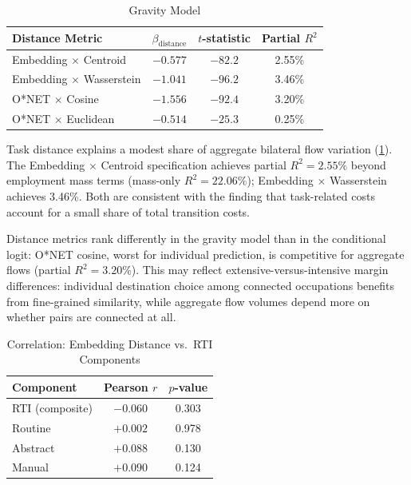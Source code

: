 \documentclass[12pt]{article}
\begin{document}
\begin{table}[h!]
\centering
\caption{Gravity Model}
\label{tab:gravity-comparison}
\begin{tabular}{lccc}
\toprule
\textbf{Distance Metric} & $\beta_{\mathrm{distance}}$ & $t$-statistic & Partial $R^2$ \\
\midrule
Embedding $\times$ Centroid & $-0.577$ & $-82.2$ & 2.55\% \\
Embedding $\times$ Wasserstein & $-1.041$ & $-96.2$ & 3.46\% \\
O*NET $\times$ Cosine & $-1.556$ & $-92.4$ & 3.20\% \\
O*NET $\times$ Euclidean & $-0.514$ & $-25.3$ & 0.25\% \\
\bottomrule
\end{tabular}
\end{table}


Task distance explains a modest share of aggregate bilateral flow variation (\cref{tab:gravity-comparison}). The Embedding $\times$ Centroid specification achieves partial $R^2 = 2.55\%$ beyond employment mass terms (mass-only $R^2 = 22.06\%$); Embedding $\times$ Wasserstein achieves 3.46\%. Both are consistent with the \citet{CortesGallipoli2018} finding that task-related costs account for a small share of total transition costs.

Distance metrics rank differently in the gravity model than in the conditional logit: O*NET cosine, worst for individual prediction, is competitive for aggregate flows (partial $R^2 = 3.20\%$). This may reflect extensive-versus-intensive margin differences: individual destination choice among connected occupations benefits from fine-grained similarity, while aggregate flow volumes depend more on whether pairs are connected at all.


\begin{table}[h!]
\centering
\caption{Correlation: Embedding Distance vs.\ RTI Components}
\label{tab:rti-correlation}
\begin{tabular}{lcc}
\toprule
\textbf{Component} & \textbf{Pearson $r$} & \textbf{$p$-value} \\
\midrule
RTI (composite) & $-0.060$ & 0.303 \\
Routine & $+0.002$ & 0.978 \\
Abstract & $+0.088$ & 0.130 \\
Manual & $+0.090$ & 0.124 \\
\bottomrule
\end{tabular}
\end{table}
\end{document}
